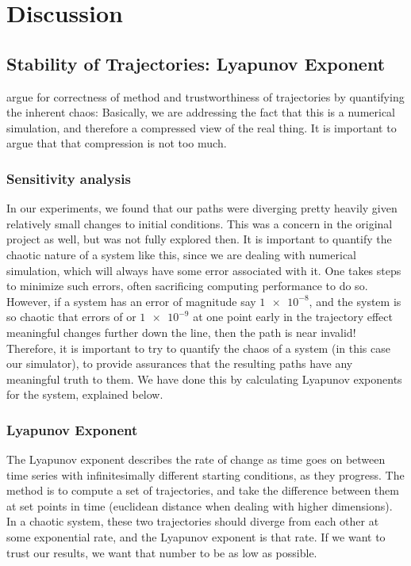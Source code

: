 
\chapter{Discussion}

\section{Stability of Trajectories: Lyapunov Exponent}
argue for correctness of method and trustworthiness of trajectories by quantifying the inherent chaos: Basically, we are addressing the fact that this is a numerical simulation, and therefore a compressed view of the real thing. It is important to argue that that compression is not too much.

\subsection{Sensitivity analysis}

In our experiments, we found that our paths were diverging pretty heavily given relatively small changes to initial conditions. This was a concern in the original project as well, but was not fully explored then. It is important to quantify the chaotic nature of a system like this, since we are dealing with numerical simulation, which will always have some error associated with it. One takes steps to minimize such errors, often sacrificing computing performance to do so. However, if a system has an error of magnitude say \(\num{1e-8}\), and the system is so chaotic that errors of or \(\num{1e-9}\) at one point early in the trajectory effect meaningful changes further down the line, then the path is near invalid! Therefore, it is important to try to quantify the chaos of a system (in this case our simulator), to provide assurances that the resulting paths have any meaningful truth to them. We have done this by calculating Lyapunov exponents for the system, explained below.

\subsection{Lyapunov Exponent}

The Lyapunov exponent describes the rate of change as time goes on between time series with infinitesimally different starting conditions, as they progress. The method is to compute a set of trajectories, and take the difference between them at set points in time (euclidean distance when dealing with higher dimensions). In a chaotic system, these two trajectories should diverge from each other at some exponential rate, and the Lyapunov exponent is that rate. If we want to trust our results, we want that number to be as low as possible. 

